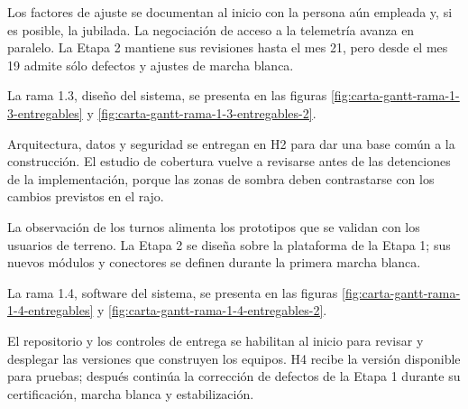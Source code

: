 \documentclass[formulario]{../../comun/overfore}
\begin{document}
\begin{horizontal}
Los factores de ajuste se documentan al inicio con la persona aún empleada y, si es posible, la jubilada. La negociación de acceso a la telemetría avanza en paralelo. La Etapa 2 mantiene sus revisiones hasta el mes 21, pero desde el mes 19 admite sólo defectos y ajustes de marcha blanca.

La rama 1.3, diseño del sistema, se presenta en las figuras \ref{fig:carta-gantt-rama-1-3-entregables} y \ref{fig:carta-gantt-rama-1-3-entregables-2}.

Arquitectura, datos y seguridad se entregan en H2 para dar una base común a la construcción. El estudio de cobertura vuelve a revisarse antes de las detenciones de la implementación, porque las zonas de sombra deben contrastarse con los cambios previstos en el rajo.

La observación de los turnos alimenta los prototipos que se validan con los usuarios de terreno. La Etapa 2 se diseña sobre la plataforma de la Etapa 1; sus nuevos módulos y conectores se definen durante la primera marcha blanca.

La rama 1.4, software del sistema, se presenta en las figuras \ref{fig:carta-gantt-rama-1-4-entregables} y \ref{fig:carta-gantt-rama-1-4-entregables-2}.

El repositorio y los controles de entrega se habilitan al inicio para revisar y desplegar las versiones que construyen los equipos. H4 recibe la versión disponible para pruebas; después continúa la corrección de defectos de la Etapa 1 durante su certificación, marcha blanca y estabilización.


\end{horizontal}
\end{document}
